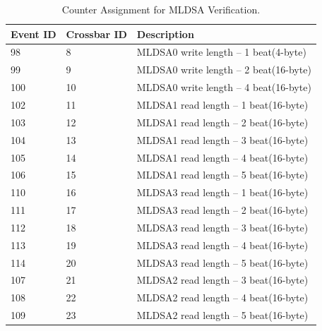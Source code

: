 \begin{table}[H]
	\caption{Counter Assignment for MLDSA Verification. }
	\label{table:t_ver}
	\centering
		\begin{tabular}{|l|l|l|}
			\hline
			\textbf{Event ID} & \textbf{Crossbar ID} & \textbf{Description}\\
			\hline

98  & 8  & MLDSA0 write length -- 1 beat(4-byte)  \\
99  & 9  & MLDSA0 write length -- 2 beat(16-byte) \\
100 & 10 & MLDSA0 write length -- 4 beat(16-byte) \\
102 & 11 & MLDSA1 read  length -- 1 beat(16-byte) \\
103 & 12 & MLDSA1 read  length -- 2 beat(16-byte) \\
104 & 13 & MLDSA1 read  length -- 3 beat(16-byte) \\
105 & 14 & MLDSA1 read  length -- 4 beat(16-byte) \\
106 & 15 & MLDSA1 read  length -- 5 beat(16-byte) \\
110 & 16 & MLDSA3 read  length -- 1 beat(16-byte) \\
111 & 17 & MLDSA3 read  length -- 2 beat(16-byte) \\
112 & 18 & MLDSA3 read  length -- 3 beat(16-byte) \\
113 & 19 & MLDSA3 read  length -- 4 beat(16-byte) \\
114 & 20 & MLDSA3 read  length -- 5 beat(16-byte) \\
107 & 21 & MLDSA2 read  length -- 3 beat(16-byte) \\
108 & 22 & MLDSA2 read  length -- 4 beat(16-byte) \\
109 & 23 & MLDSA2 read  length -- 5 beat(16-byte) \\
	\hline
		\end{tabular}
\end{table}

